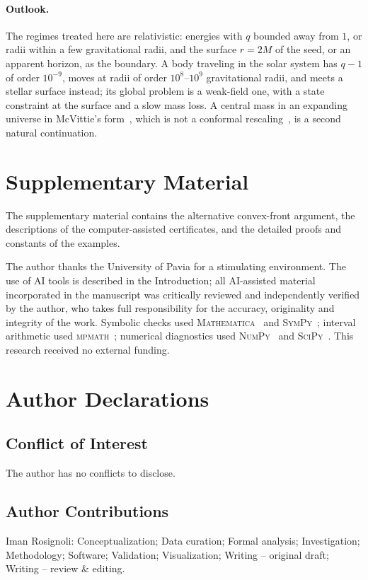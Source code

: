 \documentclass[aip,jmp,amsmath,amssymb,reprint]{revtex4-2}
\theoremstyle{plain}
\theoremstyle{definition}
\begin{document}
\paragraph{Outlook.} The regimes treated here are relativistic: energies with $q$ bounded away from $1$,
or radii within a few gravitational radii, and the surface $r=2M$ of the seed, or an apparent horizon,
as the boundary. A body traveling in
the solar system has $q-1$ of order $10^{-9}$, moves at radii of order $10^{8}$--$10^{9}$ gravitational
radii, and meets a stellar surface instead; its global problem is a weak-field one, with
a state constraint at the surface and a slow mass loss. A central mass in an expanding universe in
McVittie's form~\cite{McVittie1933}, which is not a conformal rescaling~\cite{Kaloper2010}, is a second natural
continuation.

\section*{Supplementary Material}
The supplementary material contains the alternative convex-front argument, the descriptions of the
computer-assisted certificates, and the detailed proofs and constants of the examples.

\begin{acknowledgments}
The author thanks the University of Pavia for a stimulating environment. The use of AI tools is described in the Introduction; all AI-assisted
material incorporated in the manuscript was critically reviewed and independently verified by the author, who
takes full responsibility for the accuracy, originality and integrity of the work. Symbolic checks used \textsc{Mathematica}~\cite{Mathematica} and
\textsc{SymPy}~\cite{SymPy}; interval arithmetic used \textsc{mpmath}~\cite{mpmath}; numerical diagnostics used
\textsc{NumPy}~\cite{NumPy} and \textsc{SciPy}~\cite{SciPy}. This research received no external funding.
\end{acknowledgments}

\section*{Author Declarations}
\subsection*{Conflict of Interest}
The author has no conflicts to disclose.

\subsection*{Author Contributions}
Iman Rosignoli: Conceptualization; Data curation; Formal analysis; Investigation; Methodology; Software;
Validation; Visualization; Writing -- original draft; Writing -- review \& editing.
\end{document}
